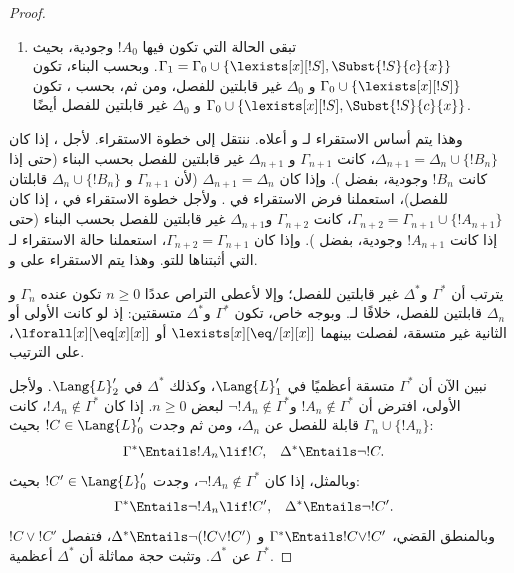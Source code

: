 \documentclass[../../../include/open-logic-section]{subfiles}
\begin{document}
\begin{proof}
\begin{enumerate}
  و$\Delta_0$ غير قابلتين للفصل بحسب البناء.
\item تبقى الحالة التي تكون فيها $!A_0$ وجودية، بحيث
  $\Gamma_1=\Gamma_0 \cup \{\lexists[x][!S],\Subst{!S}{c}{x}\}$.
  وبحسب البناء، تكون $\Gamma_0 \cup \{\lexists[x][!S]\}$ و
  $\Delta_0$ غير قابلتين للفصل، ومن ثم، بحسب ،
  تكون $\Gamma_0 \cup \{\lexists[x][!S],\Subst{!S}{c}{x}\}$ و
  $\Delta_0$ غير قابلتين للفصل أيضًا.
\end{enumerate}
وهذا يتم أساس الاستقراء لـ و أعلاه. ننتقل
إلى خطوة الاستقراء. لأجل ، إذا كان
$\Delta_{n+1}=\Delta_n \cup \{!B_n\}$، كانت $\Gamma_{n+1}$ و
$\Delta_{n+1}$ غير قابلتين للفصل بحسب البناء (حتى إذا كانت $!B_n$
وجودية، بفضل ). وإذا كان
$\Delta_{n+1}=\Delta_n$ (لأن $\Gamma_{n+1}$ و
$\Delta_n \cup \{!B_n\}$ قابلتان للفصل)، استعملنا فرض الاستقراء في
. ولأجل خطوة الاستقراء في ، إذا كان
$\Gamma_{n+2}=\Gamma_{n+1} \cup \{!A_{n+1}\}$، كانت $\Gamma_{n+2}$
و$\Delta_{n+1}$ غير قابلتين للفصل بحسب البناء (حتى إذا كانت $!A_{n+1}$
وجودية، بفضل ). وإذا كان
$\Gamma_{n+2}=\Gamma_{n+1}$، استعملنا حالة الاستقراء لـ
 التي أثبتناها للتو. وهذا يتم الاستقراء على
 و.

يترتب أن $\Gamma^*$ و$\Delta^*$ غير قابلتين للفصل؛ وإلا لأعطى التراص
عددًا $n \ge 0$ تكون عنده $\Gamma_n$ و$\Delta_n$ قابلتين للفصل، خلافًا
لـ. وبوجه خاص، تكون $\Gamma^*$ و$\Delta^*$ متسقتين: إذ
لو كانت الأولى أو الثانية غير متسقة، لفصلت بينهما
$\lexists[x][\eq/[x][x]]$ أو $\lforall[x][\eq[x][x]]$، على الترتيب.

نبين الآن أن $\Gamma^*$ متسقة أعظميًا في $\Lang{L}'_1$، وكذلك
$\Delta^*$ في $\Lang{L}'_2$. ولأجل الأولى، افترض أن
$!A_n \notin \Gamma^*$ و$\lnot !A_n \notin \Gamma^*$ لبعض
$n \ge 0$. إذا كان $!A_n \notin \Gamma^*$، كانت
$\Gamma_n \cup \{!A_n\}$ قابلة للفصل عن $\Delta_n$، ومن ثم وجدت
$!C \in \Lang{L}'_0$ بحيث:
\begin{align*}
  \Gamma^* & \Entails !A_n \lif !C, &
  \Delta^* & \Entails \lnot !C.
\end{align*}
وبالمثل، إذا كان $\lnot !A_n \notin \Gamma^*$، وجدت
$!C' \in \Lang{L}'_0$ بحيث:
\begin{align*}
  \Gamma^* & \Entails \lnot !A_n \lif !C', &
  \Delta^* & \Entails \lnot !C'.
\end{align*}
وبالمنطق القضي، $\Gamma^* \Entails !C \lor !C'$ و
$\Delta^* \Entails \lnot (!C \lor !C')$، فتفصل $!C \lor !C'$
$\Gamma^*$ عن $\Delta^*$. وتثبت حجة مماثلة أن $\Delta^*$ أعظمية.


\end{proof}
\end{document}
